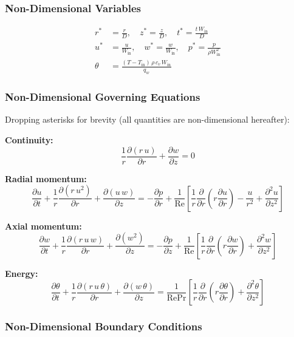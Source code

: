 \documentclass[12pt,a4paper]{article}
\newcommand{\parder}[2]{\frac{\partial #1}{\partial #2}}
\newcommand{\pparder}[2]{\frac{\partial^2 #1}{\partial {#2}^2}}
\newcommand{\Rey}{\text{Re}}
\newcommand{\Pran}{\text{Pr}}
\begin{document}
\subsubsection{Non-Dimensional Variables}
\begin{align}
    r^* &= \frac{r}{D}, \quad z^* = \frac{z}{D}, \quad t^* = \frac{t\,W_{\text{in}}}{D} \\[6pt]
    u^* &= \frac{u}{W_{\text{in}}}, \quad w^* = \frac{w}{W_{\text{in}}}, \quad
    p^* = \frac{p}{\rho W_{\text{in}}^2} \\[6pt]
    \theta &= \frac{(T - T_{\text{in}})\,\rho\, c_v\, W_{\text{in}}}{q_w}
\end{align}

\subsubsection{Non-Dimensional Governing Equations}

Dropping asterisks for brevity (all quantities are non-dimensional hereafter):

\textbf{Continuity:}
\begin{equation}
    \frac{1}{r}\parder{(r\,u)}{r} + \parder{w}{z} = 0
    \label{eq:continuity_nd}
\end{equation}

\textbf{Radial momentum:}
\begin{equation}
    \parder{u}{t} + \frac{1}{r}\parder{(r\,u^2)}{r} + \parder{(u\,w)}{z}
    = -\parder{p}{r}
      + \frac{1}{\Rey}\left[\frac{1}{r}\parder{}{r}\!\left(r\parder{u}{r}\right) - \frac{u}{r^2} + \pparder{u}{z}\right]
    \label{eq:momentum_r_nd}
\end{equation}

\textbf{Axial momentum:}
\begin{equation}
    \parder{w}{t} + \frac{1}{r}\parder{(r\,u\,w)}{r} + \parder{(w^2)}{z}
    = -\parder{p}{z}
      + \frac{1}{\Rey}\left[\frac{1}{r}\parder{}{r}\!\left(r\parder{w}{r}\right) + \pparder{w}{z}\right]
    \label{eq:momentum_z_nd}
\end{equation}

\textbf{Energy:}
\begin{equation}
    \parder{\theta}{t} + \frac{1}{r}\parder{(r\,u\,\theta)}{r} + \parder{(w\,\theta)}{z}
    = \frac{1}{\Rey\Pran}\left[\frac{1}{r}\parder{}{r}\!\left(r\parder{\theta}{r}\right) + \pparder{\theta}{z}\right]
    \label{eq:energy_nd}
\end{equation}

\subsubsection{Non-Dimensional Boundary Conditions}
\end{document}
